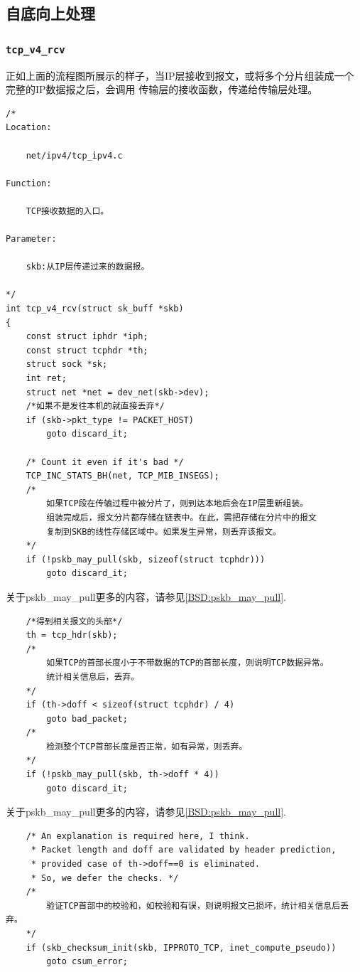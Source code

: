 		\subsection{自底向上处理}
			\subsubsection{\texttt{tcp_v4_rcv}}
				\label{TCPReceive:tcp_v4_rcv}
				正如上面的流程图所展示的样子，当IP层接收到报文，或将多个分片组装成一个完整的IP数据报之后，会调用
				传输层的接收函数，传递给传输层处理。
\begin{verbatim}
/*
Location:

	net/ipv4/tcp_ipv4.c

Function:

	TCP接收数据的入口。

Parameter:

	skb:从IP层传递过来的数据报。

*/
int tcp_v4_rcv(struct sk_buff *skb)
{
	const struct iphdr *iph;
	const struct tcphdr *th;
	struct sock *sk;
	int ret;
	struct net *net = dev_net(skb->dev);
	/*如果不是发往本机的就直接丢弃*/
	if (skb->pkt_type != PACKET_HOST)
		goto discard_it;

	/* Count it even if it's bad */
	TCP_INC_STATS_BH(net, TCP_MIB_INSEGS);
	/*
		如果TCP段在传输过程中被分片了，则到达本地后会在IP层重新组装。
		组装完成后，报文分片都存储在链表中。在此，需把存储在分片中的报文
		复制到SKB的线性存储区域中。如果发生异常，则丢弃该报文。
	*/
	if (!pskb_may_pull(skb, sizeof(struct tcphdr)))
		goto discard_it;
\end{verbatim}

	关于pskb\_may\_pull更多的内容，请参见\ref{BSD:pskb_may_pull}.

\begin{verbatim}
	/*得到相关报文的头部*/
	th = tcp_hdr(skb);
	/*
		如果TCP的首部长度小于不带数据的TCP的首部长度，则说明TCP数据异常。
		统计相关信息后，丢弃。
	*/
	if (th->doff < sizeof(struct tcphdr) / 4)
		goto bad_packet;
	/*
		检测整个TCP首部长度是否正常，如有异常，则丢弃。
	*/	
	if (!pskb_may_pull(skb, th->doff * 4))
		goto discard_it;
\end{verbatim}

	关于pskb\_may\_pull更多的内容，请参见\ref{BSD:pskb_may_pull}.

\begin{verbatim}
	/* An explanation is required here, I think.
	 * Packet length and doff are validated by header prediction,
	 * provided case of th->doff==0 is eliminated.
	 * So, we defer the checks. */
	/*
		验证TCP首部中的校验和，如校验和有误，则说明报文已损坏，统计相关信息后丢弃。
	*/
	if (skb_checksum_init(skb, IPPROTO_TCP, inet_compute_pseudo))
		goto csum_error;
\end{verbatim}

